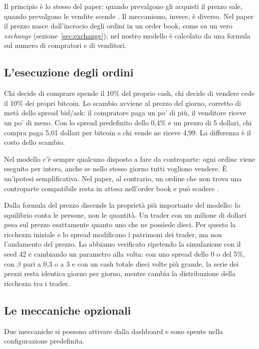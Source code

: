 Il principio è lo stesso del paper: quando prevalgono gli acquisti il prezzo sale, quando prevalgono le vendite scende \cite{paper_riferimento}. Il meccanismo, invece, è diverso. Nel paper il prezzo nasce dall'incrocio degli ordini in un order book, come su un vero \textit{exchange} (sezione~\ref{sec:exchange}); nel nostro modello è calcolato da una formula sul numero di compratori e di venditori.

\subsection{L'esecuzione degli ordini}

Chi decide di comprare spende il 10\% del proprio cash, chi decide di vendere cede il 10\% dei propri bitcoin. Lo scambio avviene al prezzo del giorno, corretto di metà dello spread bid/ask: il compratore paga un po' di più, il venditore riceve un po' di meno. Con lo spread predefinito dello 0,4\% e un prezzo di 5 dollari, chi compra paga 5,01 dollari per bitcoin e chi vende ne riceve 4,99. La differenza è il costo dello scambio.

Nel modello c'è sempre qualcuno disposto a fare da controparte: ogni ordine viene eseguito per intero, anche se nello stesso giorno tutti vogliono vendere. È un'ipotesi semplificativa. Nel paper, al contrario, un ordine che non trova una controparte compatibile resta in attesa nell'order book e può scadere \cite{paper_riferimento}.

Dalla formula del prezzo discende la proprietà più importante del modello: lo squilibrio conta le persone, non le quantità. Un trader con un milione di dollari pesa sul prezzo esattamente quanto uno che ne possiede dieci. Per questo la ricchezza iniziale e lo spread modificano i patrimoni dei trader, ma non l'andamento del prezzo. Lo abbiamo verificato ripetendo la simulazione con il seed 42 e cambiando un parametro alla volta: con uno spread dello 0 o del 5\%, con $\beta$ pari a 0,3 o a 3 e con un cash totale dieci volte più grande, la serie dei prezzi resta identica giorno per giorno, mentre cambia la distribuzione della ricchezza tra i trader.

\subsection{Le meccaniche opzionali}

Due meccaniche si possono attivare dalla dashboard e sono spente nella configurazione predefinita.

